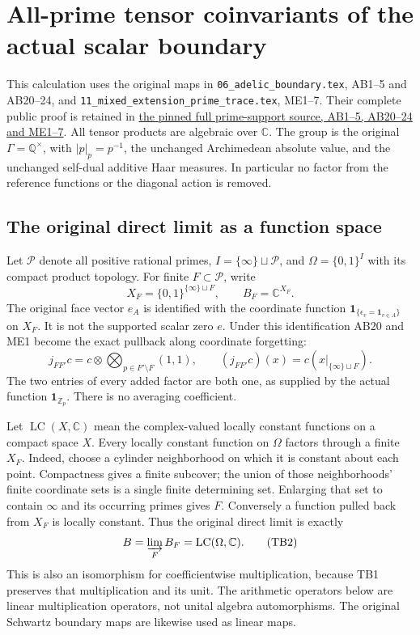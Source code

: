 \section{All-prime tensor coinvariants of the actual scalar boundary}

This calculation uses the original maps in
\texttt{06\_adelic\_boundary.tex}, AB1--5 and AB20--24, and
\texttt{11\_mixed\_extension\_prime\_trace.tex}, ME1--7.
Their complete public proof is retained in
\href{https://github.com/KokunoYumeto/zeta-function-research-reader/blob/3c78cfbd9e194d35117b33277c421c6564ce3dbf/workbenches/splitzero-tandem/continuations/20260923-full-prime-support/031/01_REBUILT_MATHEMATICS.tex}{the pinned full prime-support source, AB1--5, AB20--24 and ME1--7}.
All tensor products are algebraic over \(\mathbb C\).
The group is the original \(\Gamma=\mathbb Q^\times\), with
\(|p|_p=p^{-1}\), the unchanged Archimedean absolute value, and the
unchanged self-dual additive Haar measures. In particular no factor
from the reference functions or the diagonal action is removed.

\subsection{The original direct limit as a function space}

Let \(\mathcal P\) denote all positive rational primes,
\(I=\{\infty\}\sqcup\mathcal P\), and
\(\Omega=\{0,1\}^{I}\) with its compact product topology.
For finite \(F\subset\mathcal P\), write
\[
X_F=\{0,1\}^{\{\infty\}\sqcup F},\qquad
B_F=\mathbb C^{X_F}.
\]
The original face vector \(e_A\) is identified with the coordinate
function \(\mathbf1_{\{\epsilon_v=\mathbf1_{v\in A}\}}\) on \(X_F\).
It is not the supported scalar zero \(e\).
Under this identification AB20 and ME1 become the exact pullback
along coordinate forgetting:
\[
j_{FF'}c=c\otimes\bigotimes_{p\in F'\setminus F}(1,1),
\qquad
(j_{FF'}c)(x)=c(x|_{\{\infty\}\sqcup F}).
\tag{TB1}
\]
The two entries of every added factor are both one, as supplied by
the actual function \(\mathbf1_{\mathbb Z_p}\). There is no
averaging coefficient.

Let \(\operatorname{LC}(X,\mathbb C)\) mean the complex-valued
locally constant functions on a compact space \(X\).
Every locally constant function on \(\Omega\) factors through a
finite \(X_F\). Indeed, choose a cylinder neighborhood on which it
is constant about each point. Compactness gives a finite subcover;
the union of those neighborhoods' finite coordinate sets is a
single finite determining set. Enlarging that set to contain
\(\infty\) and its occurring primes gives \(F\).
Conversely a function pulled back from \(X_F\) is locally constant.
Thus the original direct limit is exactly
\[
B=\varinjlim_F B_F
   =\operatorname{LC}(\Omega,\mathbb C).
\tag{TB2}
\]
This is also an isomorphism for coefficientwise multiplication,
because TB1 preserves that multiplication and its unit.
The arithmetic operators below are linear multiplication
operators, not unital algebra automorphisms. The original
Schwartz boundary maps are likewise used as linear maps.

